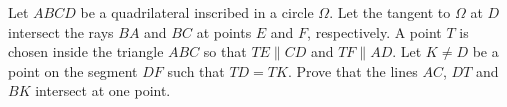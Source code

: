 Let $ABCD$ be a quadrilateral inscribed in a circle $\Omega$. Let the tangent to $\Omega$ at $D$ intersect the rays $BA$ and $BC$ at points $E$ and $F$, respectively. A point $T$ is chosen inside the triangle $ABC$ so that $TE \parallel CD$ and $TF \parallel AD$. Let $K \neq D$ be a point on the segment $DF$ such that $TD = TK$. Prove that the lines $AC$, $DT$ and $BK$ intersect at one point.
